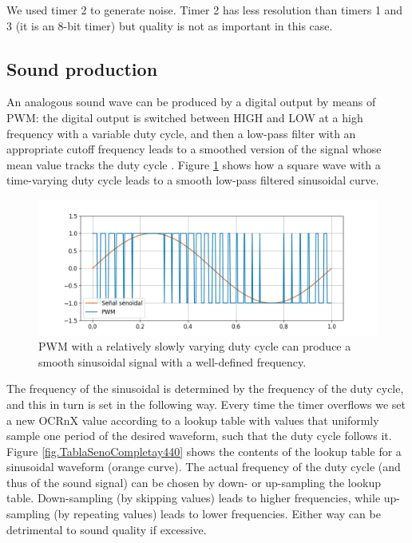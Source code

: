 \documentclass[twocolumn]{article}
\begin{document}
We used timer 2 to generate noise. Timer 2 has less resolution than timers 1 and 3 (it is an 8-bit timer) but quality is not as important in this case.


\subsection{Sound production}
\label{sec.sonido}

An analogous sound wave can be produced by a digital output by means of PWM: the digital output is switched between HIGH and LOW at a high frequency with a variable duty cycle, and then a low-pass filter with an appropriate cutoff frequency leads to a smoothed version of the signal whose mean value tracks the duty cycle \cite{arduinofading}. Figure \ref{fig.PWMsine} shows how a square wave with a time-varying duty cycle leads to a smooth low-pass filtered sinusoidal curve.

\begin{figure}[ht]
    \centering
    \includegraphics[width=\linewidth]{figures/EsquemaPWM.png}
    \caption{PWM with a relatively slowly varying duty cycle can produce a smooth sinusoidal signal with a well-defined frequency.}
    \label{fig.PWMsine}
\end{figure}


The frequency of the sinusoidal is determined by the frequency of the duty cycle, and this in turn is set in the following way. Every time the timer overflows we set a new OCRnX value according to a lookup table with values that uniformly sample one period of the desired waveform, such that the duty cycle follows it. Figure \ref{fig.TablaSenoCompletay440} shows the contents of the lookup table for a sinusoidal waveform (orange curve). The actual frequency of the duty cycle (and thus of the sound signal) can be chosen by down- or up-sampling the lookup table. Down-sampling (by skipping values) leads to higher frequencies, while up-sampling (by repeating values) leads to lower frequencies. Either way can be detrimental to sound quality if excessive.
\end{document}

